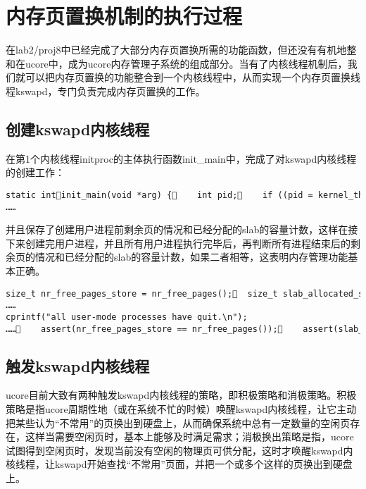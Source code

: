 \section{内存页置换机制的执行过程}\label{ux5185ux5b58ux9875ux7f6eux6362ux673aux5236ux7684ux6267ux884cux8fc7ux7a0b}

在lab2/proj8中已经完成了大部分内存页置换所需的功能函数，但还没有有机地整和在ucore中，成为ucore内存管理子系统的组成部分。当有了内核线程机制后，我们就可以把内存页置换的功能整合到一个内核线程中，从而实现一个内存页置换线程kswapd，专门负责完成内存页置换的工作。

\subsection{创建kswapd内核线程}\label{ux521bux5efakswapdux5185ux6838ux7ebfux7a0b}

在第1个内核线程initproc的主体执行函数init\_main中，完成了对kswapd内核线程的创建工作：

\begin{lstlisting}
static intinit_main(void *arg) {    int pid;    if ((pid = kernel_thread(kswapd_main, NULL, 0)) <= 0) {        panic("kswapd init failed.\n");    }    kswapd = find_proc(pid);    set_proc_name(kswapd, "kswapd");
……
\end{lstlisting}

并且保存了创建用户进程前剩余页的情况和已经分配的slab的容量计数，这样在接下来创建完用户进程，并且所有用户进程执行完毕后，再判断所有进程结束后的剩余页的情况和已经分配的slab的容量计数，如果二者相等，这表明内存管理功能基本正确。

\begin{lstlisting}
size_t nr_free_pages_store = nr_free_pages();  size_t slab_allocated_store = slab_allocated();
……
cprintf("all user-mode processes have quit.\n");
……    assert(nr_free_pages_store == nr_free_pages());    assert(slab_allocated_store == slab_allocated());    cprintf("init check memory pass.\n");    return 0;
\end{lstlisting}

\subsection{触发kswapd内核线程}\label{ux89e6ux53d1kswapdux5185ux6838ux7ebfux7a0b}

ucore目前大致有两种触发kswapd内核线程的策略，即积极策略和消极策略。积极策略是指ucore周期性地（或在系统不忙的时候）唤醒kswapd内核线程，让它主动把某些认为``不常用''的页换出到硬盘上，从而确保系统中总有一定数量的空闲页存在，这样当需要空闲页时，基本上能够及时满足需求；消极换出策略是指，ucore试图得到空闲页时，发现当前没有空闲的物理页可供分配，这时才唤醒kswapd内核线程，让kswapd开始查找``不常用''页面，并把一个或多个这样的页换出到硬盘上。

